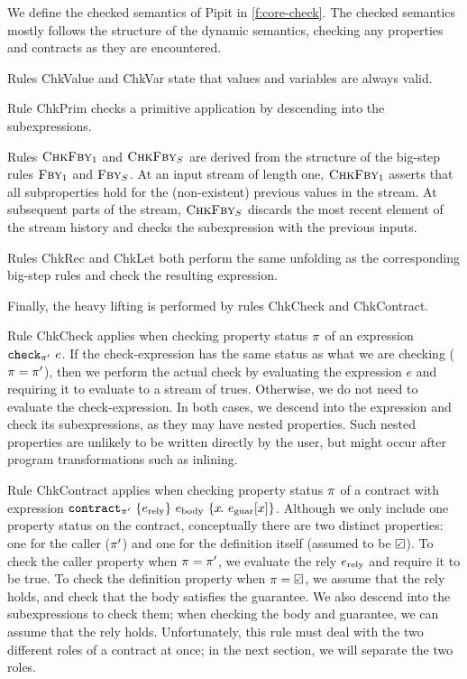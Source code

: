 We define the checked semantics of Pipit in \autoref{f:core-check}.
The checked semantics mostly follows the structure of the dynamic semantics, checking any properties and contracts as they are encountered.

Rules {\sc ChkValue} and {\sc ChkVar} state that values and variables are always valid.

Rule {\sc ChkPrim} checks a primitive application by descending into the subexpressions.

Rules $\textsc{ChkFby}_1$ and $\textsc{ChkFby}_S$ are derived from the structure of the big-step rules  $\textsc{Fby}_1$ and $\textsc{Fby}_S$.
At an input stream of length one, $\textsc{ChkFby}_1$ asserts that all subproperties hold for the (non-existent) previous values in the stream.
At subsequent parts of the stream, $\textsc{ChkFby}_S$ discards the most recent element of the stream history and checks the subexpression with the previous inputs.

Rules {\sc ChkRec} and {\sc ChkLet} both perform the same unfolding as the corresponding big-step rules and check the resulting expression.

Finally, the heavy lifting is performed by rules {\sc ChkCheck} and {\sc ChkContract}.

Rule {\sc ChkCheck} applies when checking property status $\pi$ of an expression $\texttt{check}_{\pi'}~e$.
If the check-expression has the same status as what we are checking ($\pi = \pi'$), then we perform the actual check by evaluating the expression $e$ and requiring it to evaluate to a stream of trues.
Otherwise, we do not need to evaluate the check-expression.
In both cases, we descend into the expression and check its subexpressions, as they may have nested properties.
Such nested properties are unlikely to be written directly by the user, but might occur after program transformations such as inlining.

Rule {\sc ChkContract} applies when checking property status $\pi$ of a contract with expression $\texttt{contract}_{\pi'}~\{e_{\text{rely}}\}~e_{\text{body}}~\{x\hspace{-0.1em}.~e_{\text{guar}}[x]\}$.
Although we only include one property status on the contract, conceptually there are two distinct properties: one for the caller ($\pi'$) and one for the definition itself (assumed to be $\PSValid$).
To check the caller property when $\pi = \pi'$, we evaluate the rely $e_{\text{rely}}$ and require it to be true.
To check the definition property when $\PStatus = \PSValid$, we assume that the rely holds, and check that the body satisfies the guarantee.
We also descend into the subexpressions to check them; when checking the body and guarantee, we can assume that the rely holds.
Unfortunately, this rule must deal with the two different roles of a contract at once; in the next section, we will separate the two roles.

